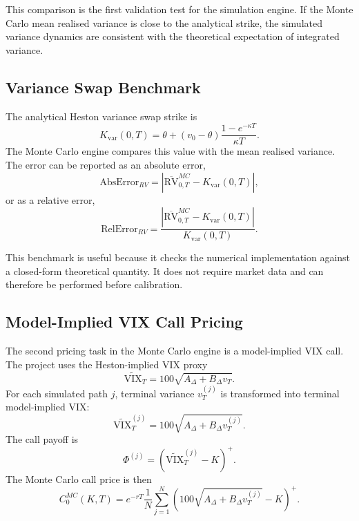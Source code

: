 This comparison is the first validation test for the simulation engine. If the Monte Carlo mean realised variance is close to the analytical strike, the simulated variance dynamics are consistent with the theoretical expectation of integrated variance.

\subsection{Variance Swap Benchmark}

The analytical Heston variance swap strike is
\begin{equation}
K_{\mathrm{var}}(0,T)
=
\theta+
(v_0-\theta)
\frac{1-e^{-\kappa T}}{\kappa T}.
\end{equation}
The Monte Carlo engine compares this value with the mean realised variance. The error can be reported as an absolute error,
\begin{equation}
\mathrm{AbsError}_{RV}
=
\left|
\overline{\mathrm{RV}}_{0,T}^{MC}
-
K_{\mathrm{var}}(0,T)
\right|,
\end{equation}
or as a relative error,
\begin{equation}
\mathrm{RelError}_{RV}
=
\frac{
\left|
\overline{\mathrm{RV}}_{0,T}^{MC}
-
K_{\mathrm{var}}(0,T)
\right|
}{
K_{\mathrm{var}}(0,T)
}.
\end{equation}

This benchmark is useful because it checks the numerical implementation against a closed-form theoretical quantity. It does not require market data and can therefore be performed before calibration.

\subsection{Model-Implied VIX Call Pricing}

The second pricing task in the Monte Carlo engine is a model-implied VIX call. The project uses the Heston-implied VIX proxy
\begin{equation}
\widetilde{\mathrm{VIX}}_T
=
100\sqrt{A_\Delta+B_\Delta v_T}.
\end{equation}
For each simulated path \(j\), terminal variance \(v_T^{(j)}\) is transformed into terminal model-implied VIX:
\begin{equation}
\widetilde{\mathrm{VIX}}_T^{(j)}
=
100\sqrt{A_\Delta+B_\Delta v_T^{(j)}}.
\end{equation}
The call payoff is
\begin{equation}
\Phi^{(j)}
=
\left(
\widetilde{\mathrm{VIX}}_T^{(j)}
-
K
\right)^+.
\end{equation}
The Monte Carlo call price is then
\begin{equation}
C_0^{MC}(K,T)
=
e^{-rT}
\frac{1}{N}
\sum_{j=1}^{N}
\left(
100\sqrt{A_\Delta+B_\Delta v_T^{(j)}}
-
K
\right)^+.
\label{eq:mc_vix_call}
\end{equation}

